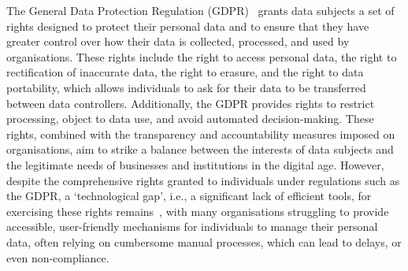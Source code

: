 \documentclass{IOS-Book-Article}     %
\begin{document}
The General Data Protection Regulation (GDPR)~\cite{gdpr} grants data subjects a set of rights designed to protect their personal data and to ensure that they have greater control over how their data is collected, processed, and used by organisations.
These rights include the right to access personal data, the right to rectification of inaccurate data, the right to erasure,
and the right to data portability, which allows individuals to ask for their data to be transferred between data controllers.
Additionally, the GDPR provides rights to restrict processing, object to data use, and avoid automated decision-making.
These rights, combined with the transparency and accountability measures imposed on organisations, aim to strike a balance between the interests of data subjects and the legitimate needs of businesses and institutions in the digital age.
However, despite the comprehensive rights granted to individuals under regulations such as the GDPR, a `technological gap', i.e., a significant lack of efficient tools, for exercising these rights remains~\cite{bernes_enhancing_2022}, with many organisations struggling to provide accessible, user-friendly mechanisms for individuals to manage their personal data, often relying on cumbersome manual processes, which can lead to delays, or even non-compliance.
\end{document}
